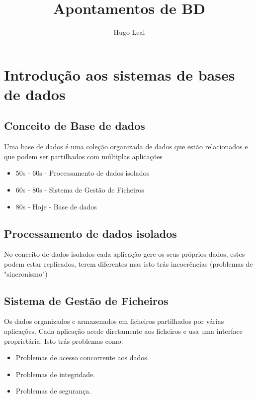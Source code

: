 \documentclass{easyclass}
\begin{document}
\begin{titlepage}
    \title{Apontamentos de BD}
    \author{Hugo Leal}
    \maketitle
\end{titlepage}

\tableofcontents
\clearpage

\section{Introdução aos sistemas de bases de dados}

\subsection{Conceito de Base de dados}
Uma base de dados é uma coleção organizada de dados que estão relacionados e que podem ser partilhados com múltiplas aplicações\\
\begin{tcolorbox}[
colframe=blue!25,
colback=blue!10,
coltitle=blue!20!black,  
fonttitle=\bfseries,
adjusted title=Evolução histórica]

\begin{itemize}
\item 50s - 60s   -   Processamento de dados isolados
\item 60s - 80s   -   Sistema de Gestão de Ficheiros
\item 80s - Hoje  -   Base de dados
\end{itemize}





\end{tcolorbox}

\subsection{Processamento de dados isolados}
No conceito de dados isolados cada aplicação gere os seus próprios dados, estes podem estar replicados, terem diferentes mas isto trás incoerências (problemas de "sincronismo")
\subsection{Sistema de Gestão de Ficheiros}
Os dados organizados e armazenados em ficheiros partilhados por várias aplicações.  Cada aplicação acede diretamente aos ficheiros e usa uma interface proprietária.  Isto trás problemas como:
\begin{itemize}
\item Problemas de acesso concorrente aos dados.
\item Problemas de integridade.
\item Problemas de segurança.
\end{itemize}
\end{document}
